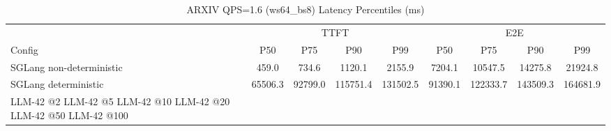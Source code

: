 \begin{table}[htbp]
\centering
\caption{ARXIV QPS=1.6 (ws64_bs8) Latency Percentiles (ms)}
\label{tab:arxiv_qps1.6_ws64_bs8}
\begin{tabular}{l|cccc|cccc}
\toprule
& \multicolumn{4}{c|}{TTFT} & \multicolumn{4}{c}{E2E} \\
Config & P50 & P75 & P90 & P99 & P50 & P75 & P90 & P99 \\
\midrule
SGLang non-deterministic & 459.0 & 734.6 & 1120.1 & 2155.9 & 7204.1 & 10547.5 & 14275.8 & 21924.8 \\
SGLang deterministic & 65506.3 & 92799.0 & 115751.4 & 131502.5 & 91390.1 & 122333.7 & 143509.3 & 164681.9 \\
LLM-42 @2%
LLM-42 @5%
LLM-42 @10%
LLM-42 @20%
LLM-42 @50%
LLM-42 @100%
\bottomrule
\end{tabular}
\end{table}
